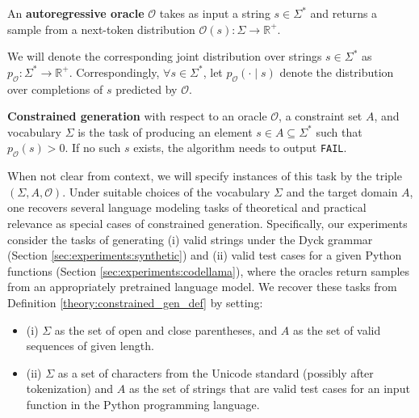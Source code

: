 \begin{definition} 
\label{theory:autoreg_gen_def}
     An \textbf{autoregressive oracle} $\mathcal{O}$ takes as input a string $s \in \Sigma^{*}$ and returns a sample from a next-token distribution $\mathcal{O}(s): \Sigma \to \mathbb{R}^+$. 
     
     We will denote the corresponding joint distribution over strings $s \in \Sigma^*$ as $p_{\mathcal{O}}:\Sigma^* \to \mathbb{R}^+$. 
     Correspondingly, $\forall s \in \Sigma^{*}$, let $p_{\mathcal{O}}(\cdot \mid s)$ denote the distribution over completions of $s$ predicted by $\mathcal{O}$.
\end{definition}
\begin{definition}
\label{theory:constrained_gen_def}
    \textbf{Constrained generation} with respect to an oracle $\mathcal{O}$, a constraint set $A$, and vocabulary $\Sigma$ is the task of producing an element $s \in A \subseteq \Sigma^{*}$ such that  $p_{\mathcal{O}}(s) > 0$. If no such $s$ exists, the algorithm needs to output \texttt{FAIL}. %
\end{definition}
When not clear from context, we will specify instances of this task by the triple $(\Sigma, A, \mathcal{O})$. Under suitable choices of the vocabulary $\Sigma$ and the target domain $A$, one recovers several language modeling tasks of theoretical and practical relevance as special cases of constrained generation. Specifically, our experiments consider the tasks of generating (i) valid strings under the Dyck grammar (Section \ref{sec:experiments:synthetic}) and (ii) valid test cases for a given Python functions (Section \ref{sec:experiments:codellama}), where the oracles return samples from an appropriately pretrained language model. We recover these tasks from Definition \ref{theory:constrained_gen_def} by setting:
\begin{itemize}
    \item (i) $\Sigma$ as the set of open and close parentheses, and $A$ as the set of valid sequences of given length.
    \item (ii) $\Sigma$ as a set of characters from the Unicode standard (possibly after tokenization) and $A$ as the set of strings that are valid test cases for an input function in the Python programming language.
\end{itemize}
